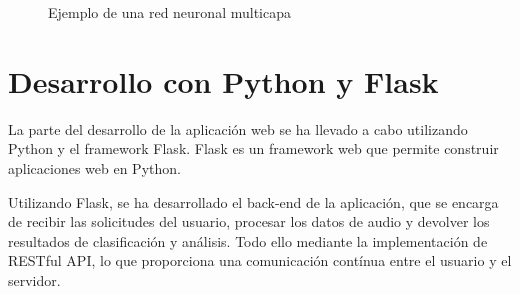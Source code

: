 \begin{figure}
  \centering
  \caption{Ejemplo de una red neuronal multicapa}
\end{figure}

\section{Desarrollo con Python y Flask}

La parte del desarrollo de la aplicación web se ha llevado a cabo utilizando Python y el framework Flask. Flask es un framework web que permite construir aplicaciones web en Python.

Utilizando Flask, se ha desarrollado el back-end de la aplicación, que se encarga de recibir las solicitudes del usuario, procesar los datos de audio y devolver los resultados de clasificación y análisis. Todo ello mediante la implementación de RESTful API, lo que proporciona una comunicación contínua entre el usuario y el servidor.

